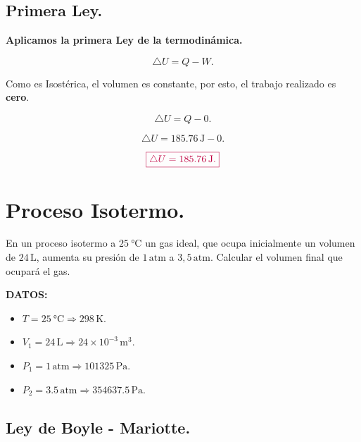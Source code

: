 \documentclass[a4paper,12pt]{article} %
\begin{document}
\subsection{Primera Ley.}

\begin{justify}
	\textbf{Aplicamos la primera Ley de la termodinámica.}
\end{justify}

\[ \triangle U = Q - W. \]

\begin{justify}
	Como es Isostérica, el volumen es constante, por esto, el trabajo realizado es \textbf{cero}.
\end{justify}

\[ \triangle U = Q - 0. \]

\[ \triangle U = 185.76 \, \mathrm{J} - 0. \]

\[ \textcolor{purple}{\boxed{\triangle U = 185.76 \, \mathrm{J} .}} \]

\section{Proceso Isotermo.}

\begin{justify}
	En un proceso isotermo a \( \SI{25}{\degreeCelsius} \) un gas ideal, que ocupa inicialmente un volumen de \( 24 \, \mathrm{L}\), aumenta su presión de \(1 \, \mathrm{atm}\) a \(3,5 \, \mathrm{atm}\). Calcular el volumen final que ocupará el gas.
\end{justify}

\begin{justify}
	\textbf{DATOS:}
\end{justify}

\begin{itemize}
	\item \( T = \SI{25}{\degreeCelsius} \Rightarrow 298 \, \mathrm{K}.  \)
	\item \( V_1 = 24 \, \mathrm{L}  \Rightarrow 24 \times 10^{-3} \, \mathrm{m}^3. \)
	\item \( P_1 = 1 \, \mathrm{atm}  \Rightarrow 101325 \, \mathrm{Pa}. \)
	\item \( P_2 = 3.5  \, \mathrm{atm} \Rightarrow 354637.5 \, \mathrm{Pa}. \)
\end{itemize}

\subsection{Ley de Boyle - Mariotte.}
\end{document}
